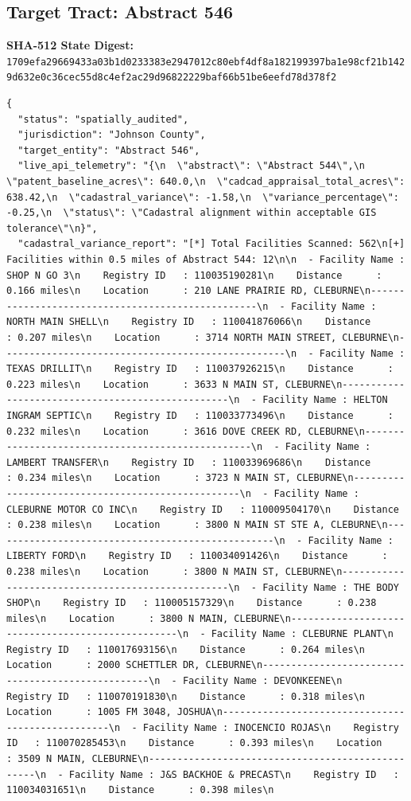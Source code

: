 \documentclass{article}
\begin{document}
\subsection*{Target Tract: Abstract 546}
\textbf{SHA-512 State Digest:}\\
\texttt{1709efa29669433a03b1d0233383e2947012c80ebf4df8a182199397ba1e98cf21b1429d632e0c36cec55d8c4ef2ac29d96822229baf66b51be6eefd78d378f2}
\begin{verbatim}
{
  "status": "spatially_audited",
  "jurisdiction": "Johnson County",
  "target_entity": "Abstract 546",
  "live_api_telemetry": "{\n  \"abstract\": \"Abstract 544\",\n  \"patent_baseline_acres\": 640.0,\n  \"cadcad_appraisal_total_acres\": 638.42,\n  \"cadastral_variance\": -1.58,\n  \"variance_percentage\": -0.25,\n  \"status\": \"Cadastral alignment within acceptable GIS tolerance\"\n}",
  "cadastral_variance_report": "[*] Total Facilities Scanned: 562\n[+] Facilities within 0.5 miles of Abstract 544: 12\n\n  - Facility Name : SHOP N GO 3\n    Registry ID   : 110035190281\n    Distance      : 0.166 miles\n    Location      : 210 LANE PRAIRIE RD, CLEBURNE\n--------------------------------------------------\n  - Facility Name : NORTH MAIN SHELL\n    Registry ID   : 110041876066\n    Distance      : 0.207 miles\n    Location      : 3714 NORTH MAIN STREET, CLEBURNE\n--------------------------------------------------\n  - Facility Name : TEXAS DRILLIT\n    Registry ID   : 110037926215\n    Distance      : 0.223 miles\n    Location      : 3633 N MAIN ST, CLEBURNE\n--------------------------------------------------\n  - Facility Name : HELTON INGRAM SEPTIC\n    Registry ID   : 110033773496\n    Distance      : 0.232 miles\n    Location      : 3616 DOVE CREEK RD, CLEBURNE\n--------------------------------------------------\n  - Facility Name : LAMBERT TRANSFER\n    Registry ID   : 110033969686\n    Distance      : 0.234 miles\n    Location      : 3723 N MAIN ST, CLEBURNE\n--------------------------------------------------\n  - Facility Name : CLEBURNE MOTOR CO INC\n    Registry ID   : 110009504170\n    Distance      : 0.238 miles\n    Location      : 3800 N MAIN ST STE A, CLEBURNE\n--------------------------------------------------\n  - Facility Name : LIBERTY FORD\n    Registry ID   : 110034091426\n    Distance      : 0.238 miles\n    Location      : 3800 N MAIN ST, CLEBURNE\n--------------------------------------------------\n  - Facility Name : THE BODY SHOP\n    Registry ID   : 110005157329\n    Distance      : 0.238 miles\n    Location      : 3800 N MAIN, CLEBURNE\n--------------------------------------------------\n  - Facility Name : CLEBURNE PLANT\n    Registry ID   : 110017693156\n    Distance      : 0.264 miles\n    Location      : 2000 SCHETTLER DR, CLEBURNE\n--------------------------------------------------\n  - Facility Name : DEVONKEENE\n    Registry ID   : 110070191830\n    Distance      : 0.318 miles\n    Location      : 1005 FM 3048, JOSHUA\n--------------------------------------------------\n  - Facility Name : INOCENCIO ROJAS\n    Registry ID   : 110070285453\n    Distance      : 0.393 miles\n    Location      : 3509 N MAIN, CLEBURNE\n--------------------------------------------------\n  - Facility Name : J&S BACKHOE & PRECAST\n    Registry ID   : 110034031651\n    Distance      : 0.398 miles\n    
\end{verbatim}
\end{document}
